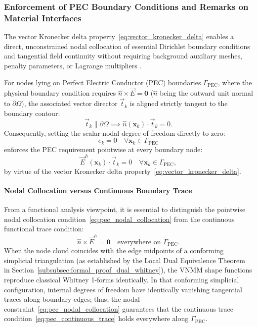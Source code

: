 \documentclass[preprint,12pt]{elsarticle}
\begin{document}
\subsubsection{Enforcement of PEC Boundary Conditions and Remarks on Material Interfaces}
The vector Kronecker delta property~\eqref{eq:vector_kronecker_delta} enables a direct, unconstrained nodal collocation of essential Dirichlet boundary conditions and tangential field continuity without requiring background auxiliary meshes, penalty parameters, or Lagrange multipliers \cite{goncalves2023vector, ortiz2021nodal}.

For nodes lying on Perfect Electric Conductor (PEC) boundaries $\Gamma_{\text{PEC}}$, where the physical boundary condition requires $\hat{n} \times \vec{E} = \mathbf{0}$ ($\hat{n}$ being the outward unit normal to $\partial\Omega$), the associated vector director $\vec{t}_k$ is aligned strictly tangent to the boundary contour:
\begin{equation}
\vec{t}_k \parallel \partial\Omega \implies \hat{n}(\mathbf{x}_k) \cdot \vec{t}_k = 0.
\end{equation}
Consequently, setting the scalar nodal degree of freedom directly to zero:
\begin{equation}
e_k = 0 \quad \forall \mathbf{x}_k \in \Gamma_{\text{PEC}}
\label{eq:pec_dirichlet_homog}
\end{equation}
enforces the PEC requirement pointwise at every boundary node:
\begin{equation}
\vec{E}^h(\mathbf{x}_k) \cdot \vec{t}_k = 0 \quad \forall \mathbf{x}_k \in \Gamma_{\text{PEC}},
\label{eq:pec_nodal_collocation}
\end{equation}
by virtue of the vector Kronecker delta property~\eqref{eq:vector_kronecker_delta}.

\paragraph{Nodal Collocation versus Continuous Boundary Trace}
From a functional analysis viewpoint, it is essential to distinguish the pointwise nodal collocation condition~\eqref{eq:pec_nodal_collocation} from the continuous functional trace condition:
\begin{equation}
\hat{n} \times \vec{E}^h = \mathbf{0} \quad \text{everywhere on } \Gamma_{\text{PEC}}.
\label{eq:pec_continuous_trace}
\end{equation}
When the node cloud coincides with the edge midpoints of a conforming simplicial triangulation (as established by the Local Dual Equivalence Theorem in Section~\ref{subsubsec:formal_proof_dual_whitney}), the VNMM shape functions reproduce classical Whitney 1-forms identically. In that conforming simplicial configuration, internal degrees of freedom have identically vanishing tangential traces along boundary edges; thus, the nodal constraint~\eqref{eq:pec_nodal_collocation} guarantees that the continuous trace condition~\eqref{eq:pec_continuous_trace} holds everywhere along $\Gamma_{\text{PEC}}$.
\end{document}
